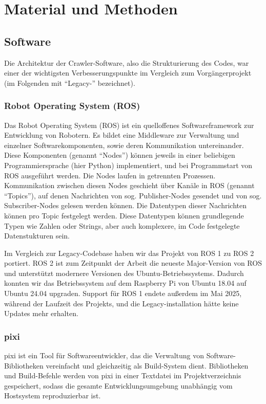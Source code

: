 \section{Material und Methoden}

\subsection{Software}

Die Architektur der Crawler-Software, also die Strukturierung des Codes, war einer der wichtigsten Verbesserungspunkte im Vergleich zum Vorgängerprojekt (im Folgenden mit ``Legacy-'' bezeichnet). 

\subsubsection{Robot Operating System (ROS)}

Das Robot Operating System (ROS)\cite{ros} ist ein quelloffenes Softwareframework zur Entwicklung von Robotern. Es bildet eine Middleware zur Verwaltung und einzelner Softwarekomponenten, sowie deren Kommunikation untereinander. Diese Komponenten (genannt ``Nodes'') können jeweils in einer beliebigen Programmiersprache (hier Python) implementiert, und bei Programmstart von ROS ausgeführt werden. Die Nodes laufen in getrennten Prozessen. Kommunikation zwischen diesen Nodes geschieht über Kanäle in ROS (genannt ``Topics''), auf denen Nachrichten von sog. Publisher-Nodes gesendet und von sog. Subscriber-Nodes gelesen werden können. Die Datentypen dieser Nachrichten können pro Topic festgelegt werden. Diese Datentypen können grundlegende Typen wie Zahlen oder Strings, aber auch komplexere, im Code festgelegte Datenstukturen sein.

Im Vergleich zur Legacy-Codebase haben wir das Projekt von ROS 1 zu ROS 2 portiert. ROS 2 ist zum Zeitpunkt der Arbeit die neueste Major-Version von ROS und unterstützt modernere Versionen des Ubuntu-Betriebssystems. Dadurch konnten wir das Betriebssystem auf dem Raspberry Pi von Ubuntu 18.04 auf Ubuntu 24.04 upgraden. Support für ROS 1 endete außerdem im Mai 2025, während der Laufzeit des Projekts, und die Legacy-installation hätte keine Updates mehr erhalten.

\subsubsection{pixi}

pixi ist ein Tool für Softwareentwickler, das die Verwaltung von Software-Bibliotheken vereinfacht und gleichzeitig als Build-System dient. Bibliotheken und Build-Befehle werden von pixi in einer Textdatei im Projektverzeichnis gespeichert, sodass die gesamte Entwicklungsumgebung unabhängig vom Hostsystem reproduzierbar ist.

